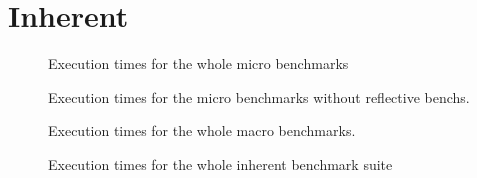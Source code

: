 \documentclass[12pt]{article}
\begin{document}
\section{Inherent}

\begin{figure}[ht]
\begin{center}
\MicroPerfComparisonPlot
\end{center}
\vspace*{-5pt}
\caption{Execution times for the whole micro benchmarks}
\label{fig:perf-overview}
\end{figure}

\MicroTableSummary

\MicroTableOverall


\begin{figure}[ht]
\begin{center}
\MicroWithoutRecursivePerfComparisonPlot
\end{center}
\vspace*{-5pt}
\caption{Execution times for the micro benchmarks without reflective benchs.}
\label{fig:perf-overview}
\end{figure}

\MicroWithoutRecursiveTableSummary

\MicroWithoutRecursiveTableOverall


\begin{figure}[ht]
\begin{center}
\MacroPerfComparisonPlot
\end{center}
\vspace*{-5pt}
\caption{Execution times for the whole macro benchmarks.}
\label{fig:perf-overview}
\end{figure}

\MacroTableSummary

\MacroTableOverall

\begin{figure}
\begin{center}
\OverallPerfComparisonPlot
\end{center}
\vspace*{-5pt}
\caption{Execution times for the whole inherent benchmark suite}
\label{fig:perf-overview}
\end{figure}

\OverallTableSummary

\OverallTableOverall
\end{document}
